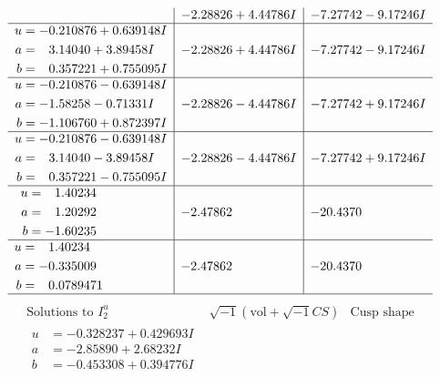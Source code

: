 \documentclass[1p]{elsarticle_modified}
\theoremstyle{definition}
\newcommand{\I}{\sqrt{-1}}
\begin{document}
$$\begin{array}{c|c|c}
 & -2.28826 + 4.44786 I & -7.27742 - 9.17246 I \\ \hline\begin{aligned}
u &= -0.210876 + 0.639148 I \\
a &= \phantom{-}3.14040 + 3.89458 I \\
b &= \phantom{-}0.357221 + 0.755095 I\end{aligned}
 & -2.28826 + 4.44786 I & -7.27742 - 9.17246 I \\ \hline\begin{aligned}
u &= -0.210876 - 0.639148 I \\
a &= -1.58258 - 0.71331 I \\
b &= -1.106760 + 0.872397 I\end{aligned}
 & -2.28826 - 4.44786 I & -7.27742 + 9.17246 I \\ \hline\begin{aligned}
u &= -0.210876 - 0.639148 I \\
a &= \phantom{-}3.14040 - 3.89458 I \\
b &= \phantom{-}0.357221 - 0.755095 I\end{aligned}
 & -2.28826 - 4.44786 I & -7.27742 + 9.17246 I \\ \hline\begin{aligned}
u &= \phantom{-}1.40234\phantom{ +0.000000I} \\
a &= \phantom{-}1.20292\phantom{ +0.000000I} \\
b &= -1.60235\phantom{ +0.000000I}\end{aligned}
 & -2.47862\phantom{ +0.000000I} & -20.4370\phantom{ +0.000000I} \\ \hline\begin{aligned}
u &= \phantom{-}1.40234\phantom{ +0.000000I} \\
a &= -0.335009\phantom{ +0.000000I} \\
b &= \phantom{-}0.0789471\phantom{ +0.000000I}\end{aligned}
 & -2.47862\phantom{ +0.000000I} & -20.4370\phantom{ +0.000000I}\\
 \hline 
 \end{array}$$\newpage$$\begin{array}{c|c|c}  
\text{Solutions to }I^u_{2}& \I (\text{vol} + \sqrt{-1}CS) & \text{Cusp shape}\\
 \hline 
\begin{aligned}
u &= -0.328237 + 0.429693 I \\
a &= -2.85890 + 2.68232 I \\
b &= -0.453308 + 0.394776 I\end{aligned}

\end{array}$$
\end{document}
